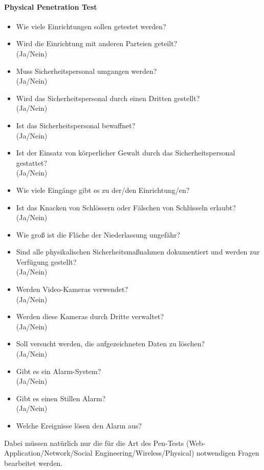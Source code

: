 \paragraph{Physical Penetration Test}
\begin{itemize}
	\item Wie viele Einrichtungen sollen getestet werden?
	\item Wird die Einrichtung mit anderen Parteien geteilt?\\
	(Ja/Nein)
	\item Muss Sicherheitspersonal umgangen werden?\\
	(Ja/Nein)
	\item Wird das Sicherheitspersonal durch einen Dritten gestellt?\\
	(Ja/Nein)
	\item Ist das Sicherheitspersonal bewaffnet?\\
	(Ja/Nein)
	\item Ist der Einsatz von körperlicher Gewalt durch das Sicherheitspersonal gestattet?\\
	(Ja/Nein)
	\item Wie viele Eingänge gibt es zu der/den Einrichtung/en?
	\item Ist das Knacken von Schlössern oder Fälschen von Schlüsseln erlaubt?\\
	(Ja/Nein)
	\item Wie groß ist die Fläche der Niederlassung ungefähr?
	\item Sind alle physikalischen Sicherheitsmaßnahmen dokumentiert und werden zur Verfügung gestellt?\\
	(Ja/Nein)
	\item Werden Video-Kameras verwendet?\\
	(Ja/Nein)
	\item Werden diese Kameras durch Dritte verwaltet?\\
	(Ja/Nein)
	\item Soll versucht werden, die aufgezeichneten Daten zu löschen?\\
	(Ja/Nein)
	\item Gibt es ein Alarm-System?\\
	(Ja/Nein)
	\item Gibt es einen Stillen Alarm?\\
	(Ja/Nein)
	\item Welche Ereignisse lösen den Alarm aus?
\end{itemize}

Dabei müssen natürlich nur die für die Art des Pen-Tests (Web-Application/Network/Social Engineering/Wireless/Physical) notwendigen Fragen bearbeitet werden.


